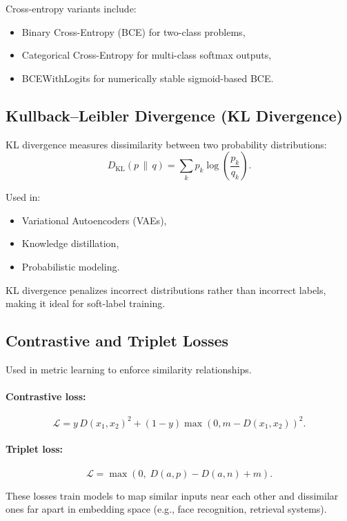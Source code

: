 \documentclass[12pt,a4paper]{report}
\begin{document}
Cross-entropy variants include:
\begin{itemize}
    \item Binary Cross-Entropy (BCE) for two-class problems,
    \item Categorical Cross-Entropy for multi-class softmax outputs,
    \item BCEWithLogits for numerically stable sigmoid-based BCE.
\end{itemize}

\vspace{1em}
\subsection{Kullback–Leibler Divergence (KL Divergence)}

KL divergence measures dissimilarity between two probability distributions:
\[
D_{\text{KL}}(p \,\|\, q) = \sum_{k} p_k \log\!\left(\frac{p_k}{q_k}\right).
\]

Used in:
\begin{itemize}
    \item Variational Autoencoders (VAEs),
    \item Knowledge distillation,
    \item Probabilistic modeling.
\end{itemize}

KL divergence penalizes incorrect distributions rather than incorrect labels, making it ideal for soft-label training.

\vspace{1em}
\subsection{Contrastive and Triplet Losses}

Used in metric learning to enforce similarity relationships.

\paragraph{Contrastive loss:}
\[
\mathcal{L} = y \, D(x_1, x_2)^2 + (1-y)\max(0, m - D(x_1, x_2))^2.
\]

\paragraph{Triplet loss:}
\[
\mathcal{L} = \max(0,\; D(a,p) - D(a,n) + m).
\]

These losses train models to map similar inputs near each other and dissimilar ones far apart in embedding space (e.g., face recognition, retrieval systems).
\end{document}
